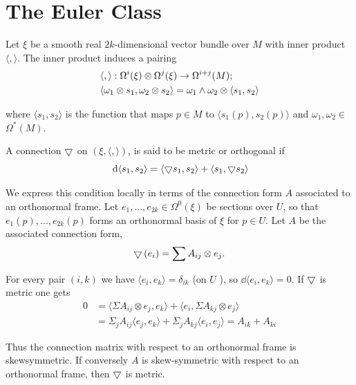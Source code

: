 \chapter{The Euler Class}
Let $\xi$ be a smooth real $2 k$-dimensional vector bundle over $M$ with inner 
product $\langle,\rangle$. The inner product induces a pairing
\[
  \begin{aligned}
    & \langle,\rangle: \Omega^{i}(\xi) \otimes \Omega^{j}(\xi) \rightarrow \Omega^{i+j}(M); \\
    & \langle\omega_{1} \otimes s_{1}, \omega_{2} \otimes s_{2}\rangle
      = \omega_{1} \wedge \omega_{2} \otimes\langle s_{1}, s_{2}\rangle
  \end{aligned}
\]

where $\langle s_{1}, s_{2}\rangle$ is the function that maps $p \in M$ to $\langle s_{1}(p), s_{2}(p)\rangle$ 
and $\omega_{1}, \omega_{2} \in$ $\Omega^{*}(M)$.


\begin{definition}\label{definition:19-1}
  A connection $\bigtriangledown$ on $(\xi,\langle,\rangle)$, is said to be metric or orthogonal if
  \[
    \dd\langle s_{1}, s_{2}\rangle
    = \langle\btd s_{1}, s_{2}\rangle+\langle s_{1}, \btd s_{2}\rangle
  \]

  We express this condition locally in terms of the connection form $A$ associated to an orthonormal 
  frame. Let $e_{1}, \ldots, e_{2k} \in \Omega^{0}(\xi)$ be sections over $U$, so that $e_{1}(p), \ldots, e_{2k}(p)$ 
  forms an orthonormal basis of $\xi$ for $p \in U$. Let $A$ be the associated connection form,
  \[
    \bigtriangledown\left(e_{i}\right)=\sum A_{i j} \otimes e_{j}.
  \]

  For every pair $(i, k)$ we have $\langle e_{i}, e_{k}\rangle=\delta_{i k}$ (on $U$ ), 
  so $\dd\langle e_{i}, e_{k}\rangle=0$. If $\bigtriangledown$ is metric one gets
  \[
    \begin{aligned}
      0 
      & =\langle\Sigma A_{i j} \otimes e_{j}, e_{k}\rangle+\langle e_{i}, \Sigma A_{k j} \otimes e_{j}\rangle \\
      & =\Sigma_{j} A_{i j}\langle e_{j}, e_{k}\rangle+\Sigma_{j} A_{k j}\langle e_{i}, e_{j}\rangle=A_{i k}+A_{k i}
    \end{aligned}
  \]

  Thus the connection matrix with respect to an orthonormal frame is skewsymmetric. If conversely $A$ is 
  skew-symmetric with respect to an orthonormal frame, then $\bigtriangledown$ is metric.
\end{definition}

